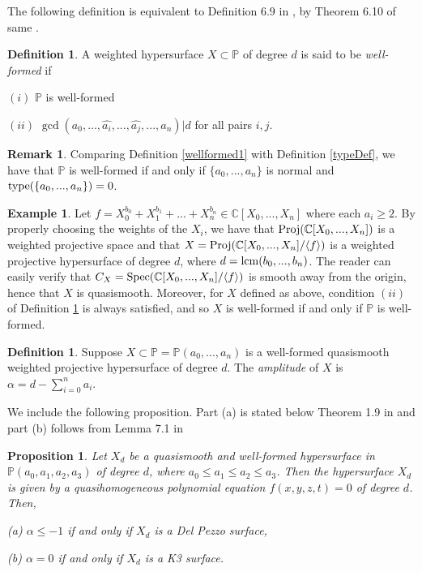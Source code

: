 \documentclass[12pt]{amsart}
\theoremstyle{plain}
\newtheorem{proposition}[subsection]{Proposition}
\theoremstyle{definition}
\newtheorem{definition}[subsection]{Definition}
\newtheorem{example}[subsection]{Example}
\newtheorem{remark}[subsection]{Remark}
\newcommand{\Spec}{		\operatorname{{\rm Spec}}}
\newcommand{\Proj}{		\operatorname{{\rm Proj}}}
\newcommand{\lcm}{		\operatorname{{\rm lcm}}}
\newcommand{\type}{		\operatorname{{\rm type}}}
\newcommand{\lb}{\langle}
\newcommand{\rb}{\rangle}
\newcommand{\Comp}{\ensuremath{\mathbb{C}}}
\newcommand{\proj}{\ensuremath{\mathbb{P}}}
\begin{document}
	The following definition is equivalent to Definition 6.9 in \cite{iano-fletcher_2000}, by Theorem 6.10 of same \cite{iano-fletcher_2000}.
	\begin{definition}	\label{wellformed2}
		A weighted hypersurface $X \subset \proj$ of degree $d$ is said to be \textit{well-formed} if 
		
		$(i)$ $\proj$ is well-formed 
		
		$(ii)$ $\gcd(a_0, ...,\hat{a_i},...,\hat{a_j},...,a_n) | d$ for all pairs $i,j$.  
	\end{definition}
	
	\begin{remark}
		Comparing Definition \ref{wellformed1} with Definition \ref{typeDef}, we have that $\proj$ is well-formed if and only if $\{a_0,..., a_n\}$ is normal and $\type(\{a_0,..., a_n\}) = 0$. 
	\end{remark}
	
	\begin{example}\label{weightedProjExample}
		Let $f = X_0^{b_0} + X_1^{b_1} + ... + X_n^{b_n} \in \Comp[X_0, ..., X_n]$ where each $a_i \geq 2$. By properly choosing the weights of the $X_i$, we have that $\Proj(\Comp[X_0, ..., X_n])$ is a weighted projective space and that $X = \Proj(\Comp[X_0, ..., X_n] / \lb f \rb)$ is a weighted projective hypersurface of degree $d$, where $d = \lcm(b_0,...,b_n)$. The reader can easily verify that $C_X = \Spec(\Comp[X_0, ..., X_n] / \lb f \rb)$ is smooth away from the origin, hence that $X$ is quasismooth. Moreover, for $X$ defined as above, condition $(ii)$ of Definition \ref{wellformed2} is always satisfied, and so $X$ is well-formed if and only if $\proj$ is well-formed.
	\end{example}
	
	\begin{definition}
		Suppose $X \subset \proj = \proj(a_0, ..., a_n)$ is a well-formed quasismooth weighted projective hypersurface of degree $d$. The \textit{amplitude} of $X$ is $\alpha = d - \sum\limits_{i=0}^n a_i$.    
	\end{definition}
	
	We include the following proposition. Part (a) is stated below Theorem 1.9 in \cite{Cheltsov2010} and part (b) follows from Lemma 7.1 in \cite{iano-fletcher_2000}
	
	\begin{proposition}
		Let $X_d$ be a quasismooth and well-formed hypersurface in $\proj(a_0,a_1,a_2,a_3)$ of degree
		$d$, where $a_0 \leq a_1 \leq  a_2 \leq a_3$. Then the hypersurface $X_d$ is given by a quasihomogeneous
		polynomial equation $f(x,y,z,t) = 0$ of degree $d$. Then,  
		
		(a) $\alpha \leq -1$ if and only if $X_d$ is a Del Pezzo surface, 
		
		(b) $\alpha = 0$ if and only if $X_d$ is a K3 surface.
	\end{proposition}
	
\end{document}
